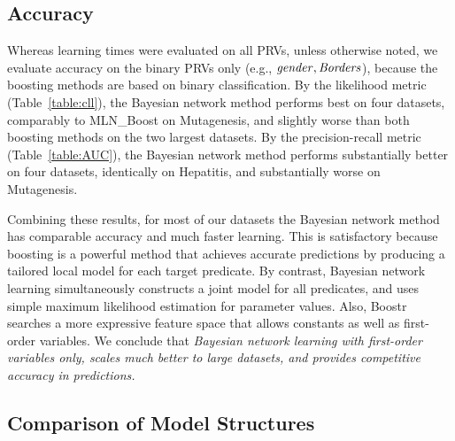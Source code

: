 \documentclass[runningheads,a4paper]{llncs}
\begin{document}
\subsection{Accuracy} Whereas learning times were evaluated on all PRVs, unless otherwise noted, we evaluate accuracy on the binary PRVs  only (e.g., $\it{gender},\it{Borders}$), because the boosting methods are based on binary classification. By the likelihood metric (Table~\ref{table:cll}), the Bayesian network method performs best on four datasets, comparably to MLN\_Boost on Mutagenesis, and slightly worse than both boosting methods on the two largest datasets. By the precision-recall metric (Table~\ref{table:AUC}), the Bayesian network method performs substantially better on four datasets, identically on Hepatitis, and substantially worse on Mutagenesis.

Combining these results, for most of our datasets the Bayesian network method has comparable accuracy and much faster learning. This is satisfactory because boosting is a powerful method that achieves accurate predictions by producing a tailored local model for each target predicate. By contrast, Bayesian network learning simultaneously constructs a joint model for all predicates, and uses simple maximum likelihood estimation for parameter values. Also, Boostr searches a more expressive feature space that allows constants as well as first-order variables.
We conclude that \emph{Bayesian network  learning with first-order variables only, scales much better to large datasets, and provides competitive accuracy in predictions.} 
 
\subsection{Comparison of Model Structures} 
\end{document}
